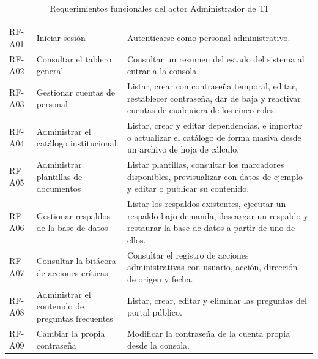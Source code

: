 	\begin{longtable}{|p{1.5cm}|p{3.6cm}|p{9.0cm}|}
		\caption{Requerimientos funcionales del actor Administrador de TI}
		\label{tab:rf_admin} \\
		\hline
		\rowcolor{headerblue}
		\headercell{ID} & \headercell{Requerimiento} & \headercell{Descripción} \\
		\hline
		\endfirsthead
	
		\hline
		\rowcolor{headerblue}
		\headercell{ID} & \headercell{Requerimiento} & \headercell{Descripción} \\
		\hline
		\endhead
	
		RF-A01 & Iniciar sesión & Autenticarse como personal administrativo. \\ \hline
	
		RF-A02 & Consultar el tablero general & Consultar un resumen del estado del sistema al
		entrar a la consola. \\ \hline
	
		RF-A03 & Gestionar cuentas de personal & Listar, crear con contraseña temporal, editar,
		restablecer contraseña, dar de baja y reactivar cuentas de cualquiera de los cinco roles.
		\\ \hline
	
		RF-A04 & Administrar el catálogo institucional & Listar, crear y editar dependencias, e
		importar o actualizar el catálogo de forma masiva desde un archivo de hoja de cálculo.
		\\ \hline
	
		RF-A05 & Administrar plantillas de documentos & Listar plantillas, consultar los marcadores
		disponibles, previsualizar con datos de ejemplo y editar o publicar su contenido. \\ \hline
	
		RF-A06 & Gestionar respaldos de la base de datos & Listar los respaldos existentes, ejecutar
		un respaldo bajo demanda, descargar un respaldo y restaurar la base de datos a partir de uno
		de ellos. \\ \hline
	
		RF-A07 & Consultar la bitácora de acciones críticas & Consultar el registro de acciones
		administrativas con usuario, acción, dirección de origen y fecha. \\ \hline
	
		RF-A08 & Administrar el contenido de preguntas frecuentes & Listar, crear, editar y eliminar
		las preguntas del portal público. \\ \hline
	
		RF-A09 & Cambiar la propia contraseña & Modificar la contraseña de la cuenta propia desde la
		consola. \\ \hline
	\end{longtable}
	

